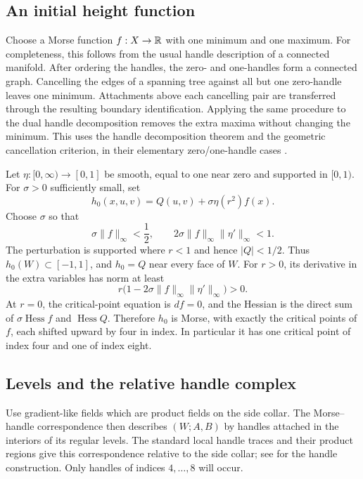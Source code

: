 \subsection{An initial height function}

Choose a Morse function $f:X\to\mathbb R$ with one minimum and one maximum.
For completeness, this follows from the usual handle description of a
connected manifold.  After ordering the handles, the zero- and
one-handles form a connected graph.  Cancelling the edges of a spanning
tree against all but one zero-handle leaves one minimum.  Attachments
above each cancelling pair are transferred through the resulting
boundary identification.  Applying the same procedure to the dual
handle decomposition removes the extra maxima without changing the
minimum.  This uses the handle decomposition theorem and the geometric
cancellation criterion, in their elementary zero/one-handle cases
\cite[Theorem~2.22 and Lemma~8.24]{Ranicki2002}.

Let $\eta:[0,\infty)\to[0,1]$ be smooth, equal to one near zero and
supported in $[0,1)$.  For $\sigma>0$ sufficiently small, set
\begin{equation}
 h_0(x,u,v)=Q(u,v)+\sigma\eta(r^2)f(x).
 \label{eq:initial-height}
\end{equation}
Choose $\sigma$ so that
\[
 \sigma\|f\|_{\infty}<\frac12,
 \qquad
 2\sigma\|f\|_{\infty}\|\eta'\|_{\infty}<1.
\]
The perturbation is supported where $r<1$ and hence $|Q|<1/2$.
Thus $h_0(W)\subset[-1,1]$, and $h_0=Q$ near every face of $W$.
For $r>0$, its derivative in the extra variables has norm at least
\[
 r\bigl(1-2\sigma\|f\|_{\infty}\|\eta'\|_{\infty}\bigr)>0.
\]
At $r=0$, the critical-point equation is $df=0$, and the Hessian is
the direct sum of $\sigma\operatorname{Hess}f$ and
$\operatorname{Hess}Q$.  Therefore $h_0$ is Morse, with exactly the
critical points of $f$, each shifted upward by four in index.  In
particular it has one critical point of index four and one of index
eight.

\subsection{Levels and the relative handle complex}

Use gradient-like fields which are product fields on the side collar.
The Morse--handle correspondence then describes $(W;A,B)$ by handles
attached in the interiors of its regular levels.  The standard local
handle traces and their product regions give this correspondence
relative to the side collar; see
\cite[Proposition~2.20 and Theorem~2.22]{Ranicki2002} for the handle
construction.  Only handles of indices $4,\ldots,8$ will occur.


